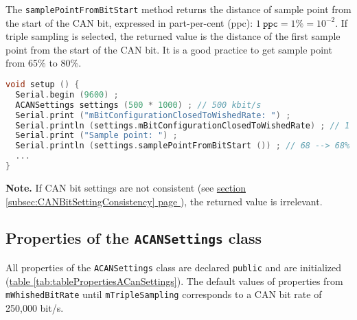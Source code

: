 \documentclass[10pt, a4paper, obeyspaces, openany]{extarticle}
\newcommand \subsectionLabel[2]{\subsection{#1}\label{subsec:#2}}
\newcommand\refSubsectionPage[1]{\hyperref[subsec:#1]{section \ref*{subsec:#1} page \pageref{subsec:#1}}}
\newcommand\refTableau[1]{\hyperref[tab:#1]{table \ref*{tab:#1}}}
\begin{document}
The \texttt{samplePointFromBitStart} method returns the distance of sample point from the start of the CAN bit, expressed in part-per-cent (ppc): $1~\texttt{ppc} = 1\% = 10^{-2}$. If triple sampling is selected, the returned value is the distance of the first sample point from the start of the CAN bit. It is a good practice to get sample point from 65\% to 80\%.

{ \small\begin{lstlisting}[language=c++]
void setup () {
  Serial.begin (9600) ;
  ACANSettings settings (500 * 1000) ; // 500 kbit/s
  Serial.print ("mBitConfigurationClosedToWishedRate: ") ;
  Serial.println (settings.mBitConfigurationClosedToWishedRate) ; // 1 (--> is true)
  Serial.print ("Sample point: ") ;
  Serial.println (settings.samplePointFromBitStart ()) ; // 68 --> 68%
  ...
}
\end{lstlisting}}

{\bf Note. } If CAN bit settings are not consistent (see \refSubsectionPage{CANBitSettingConsistency}), the returned value is irrelevant.






\subsectionLabel{Properties of the \texttt{ACANSettings} class}{propertiesACanSettings}

All properties of the \texttt{ACANSettings} class are declared \texttt{public} and are initialized (\refTableau{tablePropertiesACanSettings}). The default values of properties from \texttt{mWhishedBitRate} until \texttt{mTripleSampling} corresponds to a CAN bit rate of 250,000 bit/s.
\end{document}
